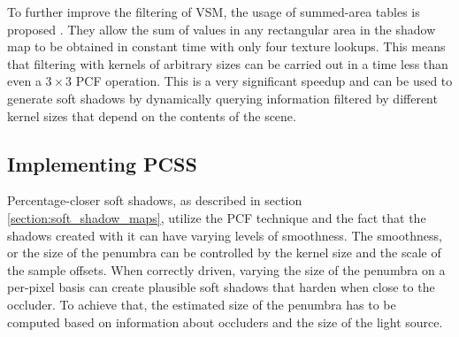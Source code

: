 To further improve the filtering of VSM, the usage of summed-area tables is proposed \cite{bib:book:gpu_gems_3}. They allow the sum of values in any rectangular area in the shadow map to be obtained in constant time with only four texture lookups. This means that filtering with kernels of arbitrary sizes can be carried out in a time less than even a \(3\times 3\) PCF operation. This is a very significant speedup and can be used to generate soft shadows by dynamically querying information filtered by different kernel sizes that depend on the contents of the scene.

\subsection{Implementing PCSS}
\label{section:pcss}
Percentage-closer soft shadows, as described in section \ref{section:soft_shadow_maps}, utilize the PCF technique and the fact that the shadows created with it can have varying levels of smoothness. The smoothness, or the size of the penumbra can be controlled by the kernel size and the scale of the sample offsets. When correctly driven, varying the size of the penumbra on a per-pixel basis can create plausible soft shadows that harden when close to the occluder. To achieve that, the estimated size of the penumbra has to be computed based on information about occluders and the size of the light source.

